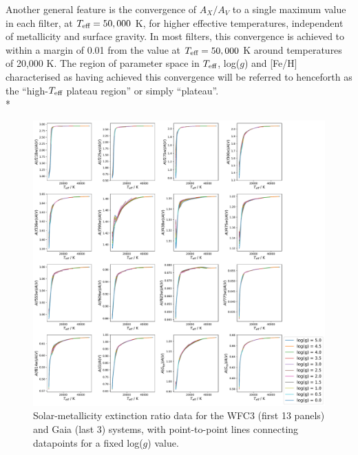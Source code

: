 \documentclass[12pt, a4paper]{report}
\begin{document}
Another general feature is the convergence of $A_{X}/A_{V}$ to a single maximum value in each filter, at $T_{\textnormal{eff}} = 50,000$ K, for higher effective temperatures, independent of metallicity and surface gravity. In most filters, this convergence is achieved to within a margin of 0.01 from the value at $T_{\textnormal{eff}} = 50,000$ K around temperatures of 20,000 K. The region of parameter space in $T_{\textnormal{eff}}$, log($g$) and [Fe/H] characterised as having achieved this convergence will be referred to henceforth as the ``high-$T_{\textnormal{eff}}$ plateau region'' or simply ``plateau''.\\*

\begin{figure}[hbtp]
\begin{center}
\includegraphics[width=0.85\paperwidth]{../just_full_data/comb/AHub_FeH0p0_just_Teff_plot_lines.pdf}
\caption{Solar-metallicity extinction ratio data for the WFC3 (first 13 panels) and Gaia (last 3) systems, with point-to-point lines connecting datapoints for a fixed log($g$) value.}
\label{just_data_FeH0_WFC3gaia}
\end{center}
\end{figure}
\end{document}
